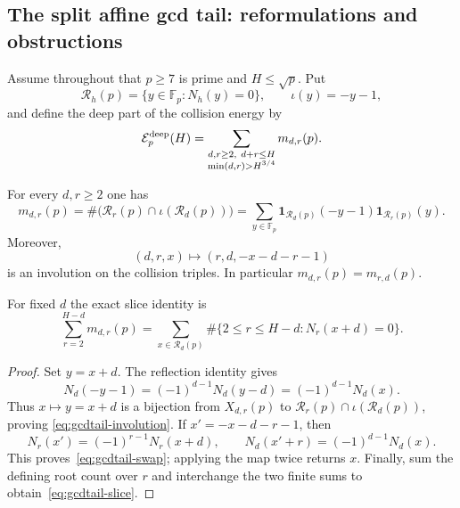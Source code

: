 
\subsection{The split affine gcd tail: reformulations and obstructions}

Assume throughout that $p\geq7$ is prime and $H\leq\sqrt p$.  Put
\[
 \mathscr R_h(p)=\{y\in\mathbb F_p:N_h(y)=0\},
 \qquad \iota(y)=-y-1,
\]
and define the deep part of the collision energy by
\[
 \mathcal E_p^{\rm deep}(H)=
 \sum_{\substack{d,r\geq2,\ d+r\leq H\\
                  \min(d,r)>H^{3/4}}}m_{d,r}(p).
\]

\begin{proposition}
\label{prop:gcdtail-involution}
For every $d,r\geq2$ one has
\begin{equation}\label{eq:gcdtail-involution}
 m_{d,r}(p)
 =\#\bigl(\mathscr R_r(p)\cap\iota(\mathscr R_d(p))\bigr)
 =\sum_{y\in\mathbb F_p}
   \mathbf1_{\mathscr R_d(p)}(-y-1)
   \mathbf1_{\mathscr R_r(p)}(y).
\end{equation}
Moreover,
\begin{equation}\label{eq:gcdtail-swap}
 (d,r,x)\longmapsto(r,d,-x-d-r-1)
\end{equation}
is an involution on the collision triples.  In particular
$m_{d,r}(p)=m_{r,d}(p)$.

For fixed $d$ the exact slice identity is
\begin{equation}\label{eq:gcdtail-slice}
 \sum_{r=2}^{H-d}m_{d,r}(p)
 =\sum_{x\in\mathscr R_d(p)}
   \#\{2\leq r\leq H-d:N_r(x+d)=0\}.
\end{equation}
\end{proposition}

\begin{proof}
Set $y=x+d$.  The reflection identity gives
\[
 N_d(-y-1)=(-1)^{d-1}N_d(y-d)=(-1)^{d-1}N_d(x).
\]
Thus $x\mapsto y=x+d$ is a bijection from $X_{d,r}(p)$ to
$\mathscr R_r(p)\cap\iota(\mathscr R_d(p))$, proving
\eqref{eq:gcdtail-involution}.  If $x'=-x-d-r-1$, then
\[
 N_r(x')=(-1)^{r-1}N_r(x+d),\qquad
 N_d(x'+r)=(-1)^{d-1}N_d(x).
\]
This proves~\eqref{eq:gcdtail-swap}; applying the map twice returns $x$.
Finally, sum the defining root count over $r$ and interchange the two
finite sums to obtain~\eqref{eq:gcdtail-slice}.
\end{proof}

